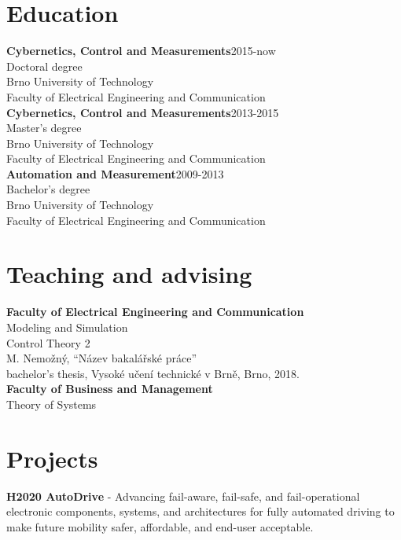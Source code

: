 \documentclass[%
  14pt,       				%
  a4paper,    				%
	twoside,      			%
	unicode,						%
]{extreport}				  %
\begin{document}
\section*{Education}

\noindent\textbf{Cybernetics, Control and Measurements}\hfill 2015-now\\
\indent Doctoral degree\\
\indent Brno University of Technology\\
\indent Faculty of Electrical Engineering and Communication\\

\noindent \textbf{Cybernetics, Control and Measurements}\hfill 2013-2015\\
\indent Master's degree\\
\indent Brno University of Technology\\
\indent Faculty of Electrical Engineering and Communication\\

\noindent\textbf{Automation and Measurement}\hfill \hfill 2009-2013\\
\indent Bachelor's degree\\
\indent Brno University of Technology\\
\indent Faculty of Electrical Engineering and Communication

\section*{Teaching and advising}
\noindent\textbf{Faculty of Electrical Engineering and Communication}\\
\indent Modeling and Simulation\\
\indent Control Theory 2\\
\indent M. Nemožný, “Název bakalářské práce”\\
\indent \indent bachelor's thesis, Vysoké učení technické v Brně, Brno, 2018.\\

\noindent\textbf{Faculty of Business and Management}\\
\indent Theory of Systems\\

\section*{Projects}
\noindent\textbf{H2020 AutoDrive} - Advancing fail-aware, fail-safe, and fail-operational electronic components, systems, and architectures for fully automated driving to make future mobility safer, affordable, and end-user acceptable.\\
\end{document}
